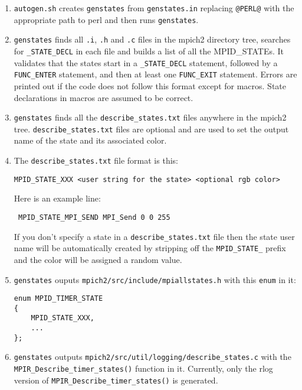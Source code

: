 \documentclass[dvipdfm,11pt]{article}
\begin{document}
\begin{enumerate}
\item \texttt{autogen.sh} creates \texttt{genstates} from 
\texttt{genstates.in} replacing \texttt{@PERL@} with the appropriate path to
perl and then runs \texttt{genstates}.

\item \texttt{genstates} finds all \texttt{.i}, \texttt{.h} and \texttt{.c} files 
in the mpich2 directory tree, searches for \texttt{\_STATE\_DECL} in each 
file and builds a list of all the MPID\_STATEs.  It validates that the states
start in a \texttt{\_STATE\_DECL} statement, followed by a \texttt{FUNC\_ENTER}
statement, and then at least one \texttt{FUNC\_EXIT} statement.  Errors are printed
out if the code does not follow this format except for macros.  State declarations
in macros are assumed to be correct.

\item \texttt{genstates} finds all the \texttt{describe\_states.txt} 
files anywhere in the mpich2 tree.  \texttt{describe\_states.txt} files are 
optional and are used to set the output name of the state and its associated 
color.

\item The \texttt{describe\_states.txt} file format is this:
\begin{verbatim}
MPID_STATE_XXX <user string for the state> <optional rgb color>
\end{verbatim}
 Here is an example line:
\begin{verbatim}
 MPID_STATE_MPI_SEND MPI_Send 0 0 255
\end{verbatim}
If you don't specify a state in a \texttt{describe\_states.txt} file then
the state user name will be automatically created by stripping off the 
\texttt{MPID\_STATE\_} prefix and the color will be assigned a random value.

\item \texttt{genstates} ouputs \texttt{mpich2/src/include/mpiallstates.h} 
with this \texttt{enum} in it:
\begin{verbatim}
enum MPID_TIMER_STATE
{
    MPID_STATE_XXX,
    ...
};
\end{verbatim}

\item \texttt{genstates} outputs 
\texttt{mpich2/src/util/logging/describe\_states.c} with the
\texttt{MPIR\_Describe\_timer\_states()} function in it.  Currently, only 
the rlog version of \texttt{MPIR\_Describe\_timer\_states()} is generated.

\end{enumerate}
\end{document}
